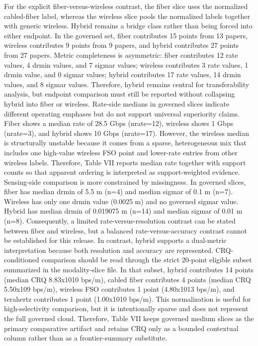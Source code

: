 {}For the explicit fiber-versus-wireless contrast, the fiber slice uses the normalized cabled-fiber label, whereas the wireless slice pools the normalized  labels together with generic wireless. Hybrid remains a bridge class rather than being forced into either endpoint. In the governed set, fiber contributes 15 points from 13 papers, wireless contributes 9 points from 9 papers, and hybrid contributes 27 points from 27 papers. Metric completeness is asymmetric: fiber contributes 12 rate values, 4 drmin values, and 7 sigma\markdownRendererUnderscore{}r values; wireless contributes 3 rate values, 1 drmin value, and 0 sigma\markdownRendererUnderscore{}r values; hybrid contributes 17 rate values, 14 drmin values, and 8 sigma\markdownRendererUnderscore{}r values. Therefore, hybrid remains central for transferability analysis, but endpoint comparison must still be reported without collapsing hybrid into fiber or wireless.\markdownRendererParagraphSeparator
{}Rate-side medians in governed slices indicate different operating emphases but do not support universal superiority claims. Fiber shows a median rate of 28.5 Gbps (n\markdownRendererUnderscore{}rate=12), wireless shows 1 Gbps (n\markdownRendererUnderscore{}rate=3), and hybrid shows 10 Gbps (n\markdownRendererUnderscore{}rate=17). However, the wireless median is structurally unstable because it comes from a sparse, heterogeneous mix that includes one high-value wireless FSO point and lower-rate entries from other wireless labels. Therefore, Table VII reports median rate together with support counts so that apparent ordering is interpreted as support-weighted evidence.\markdownRendererParagraphSeparator
{}Sensing-side comparison is more constrained by missingness. In governed slices, fiber has median drmin of 5.5 m (n=4) and median sigma\markdownRendererUnderscore{}r of 0.1 m (n=7). Wireless has only one drmin value (0.0025 m) and no governed sigma\markdownRendererUnderscore{}r value. Hybrid has median drmin of 0.019075 m (n=14) and median sigma\markdownRendererUnderscore{}r of 0.01 m (n=8). Consequently, a limited rate-versus-resolution contrast can be stated between fiber and wireless, but a balanced rate-versus-accuracy contrast cannot be established for this release. In contrast, hybrid supports a dual-metric interpretation because both resolution and accuracy are represented.\markdownRendererParagraphSeparator
{}CRQ-conditioned comparison should be read through the strict 20-point eligible subset summarized in the modality-slice file. In that subset, hybrid contributes 14 points (median CRQ 8.83x10\markdownRendererCircumflex{}10 bps/m), cabled fiber contributes 4 points (median CRQ 5.50x10\markdownRendererCircumflex{}9 bps/m), wireless FSO contributes 1 point (4.80x10\markdownRendererCircumflex{}13 bps/m), and terahertz contributes 1 point (1.00x10\markdownRendererCircumflex{}10 bps/m). This normalization is useful for high-selectivity comparison, but it is intentionally sparse and does not represent the full governed cloud. Therefore, Table VII keeps governed medium slices as the primary comparative artifact and retains CRQ only as a bounded contextual column rather than as a frontier-summary substitute.\markdownRendererParagraphSeparator
